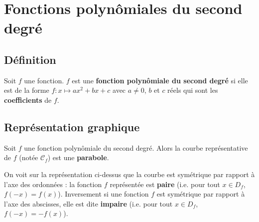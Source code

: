 


	
	
	
	
	\section{Fonctions polynômiales du second degré}
	
	\subsection{Définition}
	
	\begin{formula}[Définition]
		Soit $f$ une fonction. $f$ est une \textbf{fonction polynômiale du second degré} si elle est de la forme $f : x \mapsto ax^2 + bx + c$ avec $a \neq 0$, $b$ et $c$ réels qui sont les \textbf{coefficients} de $f$.
	\end{formula}
	
	\subsection{Représentation graphique}
	
	\begin{formula}[Parabole]
		Soit $f$ une fonction polynômiale du second degré. Alors la courbe représentative de $f$ (notée $\mathcal{C}_f$) est une \textbf{parabole}.
	\end{formula}
	
	
	\begin{tip}
		On voit sur la représentation ci-dessus que la courbe est symétrique par rapport à l'axe des ordonnées : la fonction $f$ représentée est \textbf{paire} (i.e. pour tout $x \in D_f$, $f(-x) = f(x)$).
		\newpar
		Inversement si une fonction $f$ est symétrique par rapport à l'axe des abscisses, elle est dite \textbf{impaire} (i.e. pour tout $x \in D_f$, $f(-x) = -f(x)$).
	\end{tip}
	
